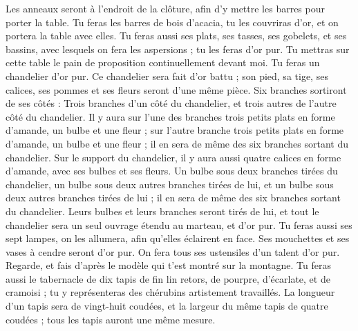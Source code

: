 \begin{multicols}{2}
Les anneaux seront à l'endroit de la clôture, afin d'y mettre les barres pour porter la table.
Tu feras les barres de bois d’acacia, tu les couvriras d'or, et on portera la table avec elles.
Tu feras aussi ses plats, ses tasses, ses gobelets, et ses bassins, avec lesquels on fera les aspersions ; tu les feras d’or pur.
Tu mettras sur cette table le pain de proposition continuellement devant moi.
Tu feras un chandelier d’or pur. Ce chandelier sera fait d’or battu ; son pied, sa tige, ses calices, ses pommes et ses fleurs seront d’une même pièce.
Six branches sortiront de ses côtés : Trois branches d'un côté du chandelier, et trois autres de l'autre côté du chandelier.
Il y aura sur l’une des branches trois petits plats en forme d'amande, un bulbe et une fleur ; sur l'autre branche trois petits plats en forme d'amande, un bulbe et une fleur ; il en sera de même des six branches sortant du chandelier.
Sur le support du chandelier, il y aura aussi quatre calices en forme d'amande, avec ses bulbes et ses fleurs.
Un bulbe sous deux branches tirées du chandelier, un bulbe sous deux autres branches tirées de lui, et un bulbe sous deux autres branches tirées de lui ; il en sera de même des six branches sortant du chandelier.
Leurs bulbes et leurs branches seront tirés de lui, et tout le chandelier sera un seul ouvrage étendu au marteau, et d’or pur.
Tu feras aussi ses sept lampes, on les allumera, afin qu'elles éclairent en face.
Ses mouchettes et ses vases à cendre seront d’or pur.
On fera tous ses ustensiles d'un talent d’or pur.
Regarde, et fais d’après le modèle qui t'est montré sur la montagne.
\VerseOne{}Tu feras aussi le tabernacle de dix tapis de fin lin retors, de pourpre, d'écarlate, et de cramoisi ; tu y représenteras des chérubins artistement travaillés.
La longueur d'un tapis sera de vingt-huit coudées, et la largeur du même tapis de quatre coudées ; tous les tapis auront une même mesure.

\end{multicols}
